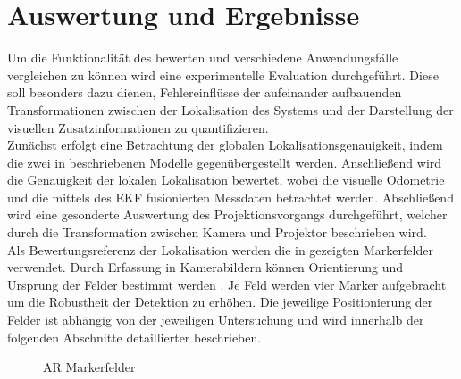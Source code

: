 \chapter{\red[Experimentelle ]Auswertung und Ergebnisse}
\label{chap.results}

Um die Funktionalität des  bewerten und verschiedene Anwendungsfälle vergleichen zu können wird eine experimentelle Evaluation durchgeführt. Diese soll besonders dazu dienen, Fehlereinflüsse der aufeinander aufbauenden Transformationen zwischen der Lokalisation des Systems und der Darstellung der visuellen Zusatzinformationen zu quantifizieren.\\

Zunächst erfolgt eine Betrachtung der globalen Lokalisationsgenauigkeit, indem die zwei in  beschriebenen Modelle gegenübergestellt werden. Anschließend wird die Genauigkeit der lokalen Lokalisation bewertet, wobei die visuelle Odometrie und die mittels des EKF fusionierten Messdaten betrachtet werden. Abschließend wird eine gesonderte Auswertung des Projektionsvorgangs durchgeführt, welcher durch die Transformation zwischen Kamera und Projektor beschrieben wird.\\

Als Bewertungsreferenz  der Lokalisation werden die in  gezeigten Markerfelder verwendet. Durch Erfassung in Kamerabildern können Orientierung und Ursprung der Felder bestimmt werden . Je Feld werden vier Marker aufgebracht um die Robustheit der Detektion zu erhöhen. Die jeweilige Positionierung der Felder ist abhängig von der jeweiligen Untersuchung und wird innerhalb der folgenden Abschnitte detaillierter beschrieben.\\

\begin{figure}[!ht]
	\begin{center}
	
	\hspace{5mm}
	\caption{AR Markerfelder}
	\label{fig.armarker}
	\end{center}
\end{figure}

